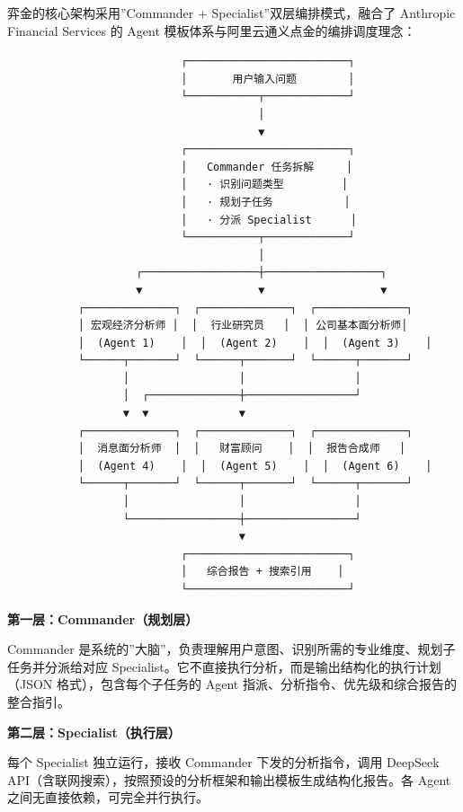 \documentclass[
]{ctexart}
\begin{document}
弈金的核心架构采用''Commander + Specialist''双层编排模式，融合了
Anthropic Financial Services 的 Agent
模板体系与阿里云通义点金的编排调度理念：

\begin{verbatim}
                           ┌─────────────────────────┐
                           │       用户输入问题        │
                           └───────────┬─────────────┘
                                       │
                                       ▼
                           ┌─────────────────────────┐
                           │   Commander 任务拆解     │
                           │   · 识别问题类型         │
                           │   · 规划子任务           │
                           │   · 分派 Specialist      │
                           └───────────┬─────────────┘
                                       │
                    ┌──────────────────┼──────────────────┐
                    ▼                  ▼                  ▼
           ┌──────────────┐  ┌──────────────┐  ┌──────────────┐
           │ 宏观经济分析师 │  │  行业研究员   │  │ 公司基本面分析师│
           │  (Agent 1)    │  │  (Agent 2)    │  │  (Agent 3)    │
           └──────┬───────┘  └──────┬───────┘  └──────┬───────┘
                  │                 │                 │
                  │  ┌──────────────┼─────────────────┘
                  ▼  ▼              ▼
           ┌──────────────┐  ┌──────────────┐  ┌──────────────┐
           │  消息面分析师  │  │   财富顾问    │  │  报告合成师   │
           │  (Agent 4)    │  │  (Agent 5)    │  │  (Agent 6)    │
           └──────┬───────┘  └──────┬───────┘  └──────┬───────┘
                  │                 │                 │
                  └─────────────────┼─────────────────┘
                                    ▼
                           ┌─────────────────────────┐
                           │   综合报告 + 搜索引用    │
                           └─────────────────────────┘
\end{verbatim}

\textbf{第一层：Commander（规划层）}

Commander
是系统的''大脑''，负责理解用户意图、识别所需的专业维度、规划子任务并分派给对应
Specialist。它不直接执行分析，而是输出结构化的执行计划（JSON
格式），包含每个子任务的 Agent
指派、分析指令、优先级和综合报告的整合指引。

\textbf{第二层：Specialist（执行层）}

每个 Specialist 独立运行，接收 Commander 下发的分析指令，调用 DeepSeek
API（含联网搜索），按照预设的分析框架和输出模板生成结构化报告。各 Agent
之间无直接依赖，可完全并行执行。
\end{document}
